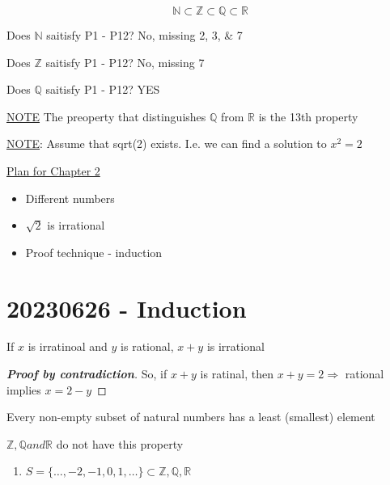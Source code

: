 \documentclass{report}
\begin{document}
    \[ \mathbb{N}   \subset \mathbb{Z} \subset \mathbb{Q} \subset \mathbb{R} \]

    Does $\mathbb{N}  $ saitisfy P1 - P12?  No, missing 2, 3, \& 7

    Does $\mathbb{Z}  $ saitisfy P1 - P12?  No, missing 7

    Does $\mathbb{Q}  $ saitisfy P1 - P12?  YES

    \underline{NOTE} The preoperty that distinguishes $\mathbb{Q} $ from
    $\mathbb{R}$ is the 13th property

    \underline{NOTE}:  Assume that sqrt(2) exists.  I.e. we can
    find a solution to $x^2 = 2$


    \underline{Plan for Chapter 2}
    \begin{itemize}
      \item Different numbers
      \item $\sqrt{2}$ is irrational
      \item Proof technique - induction
    \end{itemize}
\section*{20230626 - Induction}%
   {
    If $x$ is irratinoal and $y$ is rational, $x+y$ is irrational
  }
  \renewcommand\qedsymbol{\Lightning}
  \begin{proof}[\textbf{Proof by contradiction}]  
    So, if $x+y$ is ratinal, then $x+y = 2 \Rightarrow $ rational  implies $x = 2-y$
  \end{proof} 
  \renewcommand\qedsymbol{$\square$}

   {
    Every non-empty subset of natural numbers has a least (smallest)
    element
  }

   {
    $\mathbb{Z} , \mathbb{Q} and \mathbb{R}$ do not have this property
    \begin{enumerate}
      \item $S = \{ \dots, -2, -1 , 0, 1, \dots \} \subset \mathbb{Z} , \mathbb{Q} , \mathbb{R}$
    \end{enumerate}
  }
\end{document}
